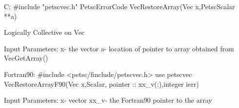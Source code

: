 C:
#include "petscvec.h"
PetscErrorCode VecRestoreArray(Vec x,PetscScalar **a)

Logically Collective on Vec

Input Parameters:
x- the vector
a- location of pointer to array obtained from VecGetArray()

Fortran90:
#include <petsc/finclude/petscvec.h>
use petscvec
VecRestoreArrayF90(Vec x,{Scalar, pointer :: xx_v(:)},integer ierr)

Input Parameters:
x- vector
xx_v- the Fortran90 pointer to the array
